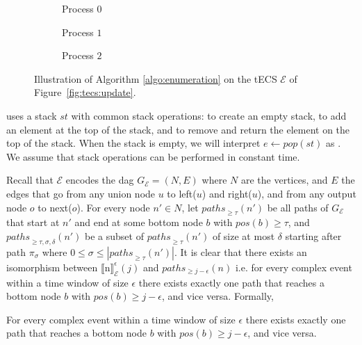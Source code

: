 \begin{figure}[h]
  \centering
  \begin{subfigure}[b]{0.3\linewidth}
    \centering
    \caption{Process $0$}
  \end{subfigure}
  \hfill
  \begin{subfigure}[b]{0.3\linewidth}
    \centering
    \caption{Process $1$}
  \end{subfigure}
  \hfill
  \begin{subfigure}[b]{0.3\linewidth}
    \centering
    \caption{Process $2$}
  \end{subfigure}

  \caption{Illustration of Algorithm \ref{algo:enumeration} on the tECS $\mathcal{E}$ of Figure~\ref{fig:tecs:update}.}
  \label{fig:tecs:enumeration}
\end{figure}

 uses a stack $st$ with common stack operations:  to create an empty stack,  to add an element  at the top of the stack, and  to remove and return the element on the top of the stack. When the stack is empty, we will interpret $e \leftarrow pop(st)$ as . We assume that stack operations can be performed in constant time.

Recall that $\mathcal{E}$ encodes the \acrshort{dag} $G_{\mathcal{E}} = (N, E)$ where $N$ are the vertices, and $E$ the edges that go from any union node $u$ to left($u$) and right($u$), and from any output node $o$ to next($o$). For every node $n' \in N$, let ${paths}_{\ge \tau}(n')$ be all paths of $G_{\mathcal{E}}$ that start at $n'$ and end at some bottom node $b$ with $pos(b) \ge \tau$, and ${paths}_{\ge \tau, \sigma, \delta}(n')$ be a subset of ${paths}_{\ge \tau}(n')$ of size at most $\delta$ starting after path $\pi_{\sigma}$ where $0 \le \sigma \le |{paths}_{\ge \tau}(n')|$. It is clear that there exists an isomorphism between ${\llbracket \text{n} \rrbracket}^{\epsilon}_{\mathcal{E}}(j)$ and $paths_{\ge j - \epsilon}(n)$ i.e. for every complex event within a time window of size $\epsilon$ there exists exactly one path that reaches a bottom node $b$ with $pos(b) \ge j - \epsilon$, and vice versa. Formally,

\begin{theorem}\label{theorem:isomorphism}
For every complex event within a time window of size $\epsilon$ there exists exactly one path that reaches a bottom node $b$ with $pos(b) \ge j - \epsilon$, and vice versa.
\end{theorem}

